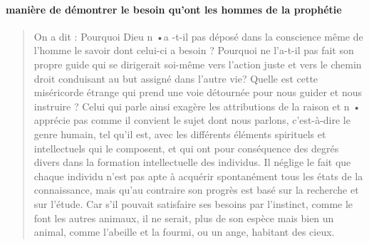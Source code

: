 \cite{Abdou:Rissalat}

\paragraph{manière de démontrer le besoin qu'ont les hommes de la prophétie}
\begin{quote}
   On a dit : Pourquoi Dieu n •a -t-il pas déposé dans la conscience même
de l'homme le savoir dont celui-ci a besoin ? Pourquoi ne l'a-t-il pas fait
son propre guide qui se dirigerait soi-même vers l'action juste et vers le
chemin droit conduisant au but assigné dans l'autre vie? Quelle est
cette miséricorde étrange qui prend une voie détournée pour nous
guider et nous instruire ? Celui qui parle ainsi exagère les attributions
de la raison et n • apprécie pas comme il convient le sujet dont nous parlons,
c'est-à-dire le genre humain, tel qu'il est, avec les différents éléments
spirituels et intellectuels qui le composent, et qui ont pour conséquence
des degrés divers dans la formation intellectuelle des individus. Il
néglige le fait que chaque individu n'est pas apte à acquérir spontanément
tous les états de la connaissance, mais qu'au contraire son progrès
est basé sur la recherche et sur l'étude. Car s'il pouvait satisfaire
ses besoins par l'instinct, comme le font les autres animaux, il ne serait,
plus de son espèce mais bien un animal, comme l'abeille et la fourmi,
ou un ange, habitant des cieux.
\end{quote}

